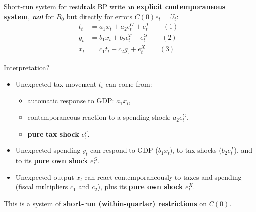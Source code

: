 \documentclass{beamer}
\begin{document}
\begin{frame}{Short-run system for residuals}
\small
BP write an \textbf{explicit contemporaneous system}, \textit{\textbf{not }}for $B_0$ but directly for errors $C(0)e_t=U_t$:
\[
\begin{aligned}
t_t &= a_1 x_t + a_2 e^G_t + e^T_t \qquad (1) \\
g_t &= b_1 x_t + b_2 e^T_t + e^G_t \qquad (2) \\
x_t &= c_1 t_t + c_2 g_t + e^X_t \qquad (3)
\end{aligned}
\]

Interpretation?
\pause
\begin{itemize}
  \item Unexpected tax movement $t_t$ can come from:
  \begin{itemize}
    \item automatic response to GDP: $a_1 x_t$,
    \item contemporaneous reaction to a spending shock: $a_2 e^G_t$,
    \item \textbf{pure tax shock} $e^T_t$.
  \end{itemize}
  \item Unexpected spending $g_t$ can respond to GDP ($b_1 x_t$),
        to tax shocks ($b_2 e^T_t$), and to its \textbf{pure own shock} $e^G_t$.
  \item Unexpected output $x_t$ can react contemporaneously to taxes and spending
        (fiscal multipliers $c_1$ and $c_2$), plus its\textbf{ pure own shock} $e^X_t$.
\end{itemize}

\medskip
This is a system of \textbf{short-run (within-quarter) restrictions} on $C(0)$.
\end{frame}
\end{document}
